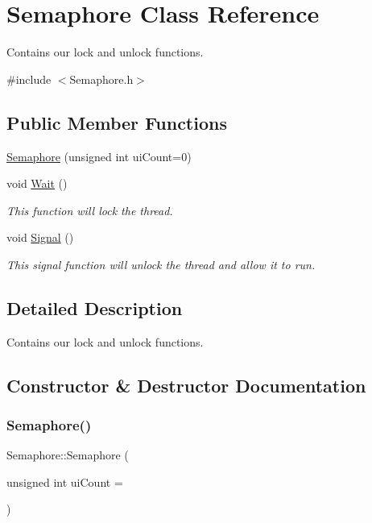 \hypertarget{class_semaphore}{}\section{Semaphore Class Reference}
\label{class_semaphore}


Contains our lock and unlock functions.  




{\ttfamily \#include $<$Semaphore.\+h$>$}

\subsection*{Public Member Functions}
\begin{DoxyCompactItemize}
\item 
\mbox{\hyperlink{class_semaphore_a0d9290d316636875ca85d1d78950a817}{Semaphore}} (unsigned int ui\+Count=0)
\item 
void \mbox{\hyperlink{class_semaphore_a72aabebf026e3a8b1f3e4d0fa8ee1eda}{Wait}} ()
\begin{DoxyCompactList}\small\item\em This function will lock the thread. \end{DoxyCompactList}\item 
void \mbox{\hyperlink{class_semaphore_a86f92f738b4486439b296d8e235895f2}{Signal}} ()
\begin{DoxyCompactList}\small\item\em This signal function will unlock the thread and allow it to run. \end{DoxyCompactList}\end{DoxyCompactItemize}


\subsection{Detailed Description}
Contains our lock and unlock functions. 

\subsection{Constructor \& Destructor Documentation}
\mbox{\label{class_semaphore_a0d9290d316636875ca85d1d78950a817}} 
\subsubsection{\texorpdfstring{Semaphore()}{Semaphore()}}
{\footnotesize\ttfamily Semaphore\+::\+Semaphore (\begin{DoxyParamCaption}\item[{unsigned int}]{ui\+Count = {} }\end{DoxyParamCaption})\hspace{0.3cm}{\ttfamily [inline]}}



